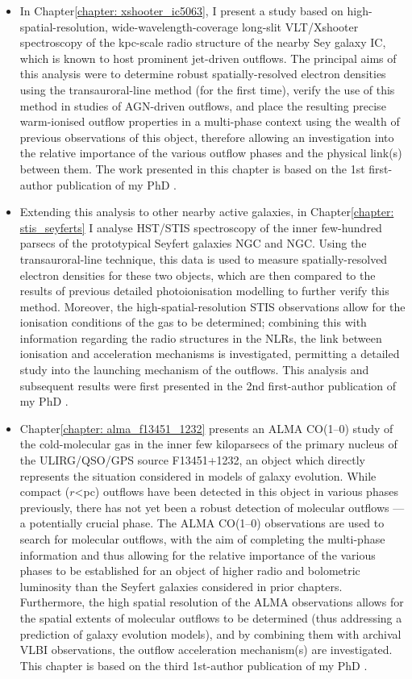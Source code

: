 \begin{itemize}
    \item In Chapter\;\ref{chapter: xshooter_ic5063}, I present a study based on high-spatial-resolution, wide-wavelength-coverage long-slit VLT/Xshooter spectroscopy of the kpc-scale radio structure of the nearby Sey galaxy IC, which is known to host prominent jet-driven outflows. The principal aims of this analysis were to determine robust spatially-resolved electron densities using the transauroral-line method (for the first time), verify the use of this method in studies of AGN-driven outflows, and place the resulting precise warm-ionised outflow properties in a multi-phase context using the wealth of previous observations of this object, therefore allowing an investigation into the relative importance of the various outflow phases and the physical link(s) between them. The work presented in this chapter is based on the 1st first-author publication of my PhD \citep{Holden2023}.
    \item Extending this analysis to other nearby active galaxies, in Chapter\;\ref{chapter: stis_seyferts} I analyse HST/STIS spectroscopy of the inner few-hundred parsecs of the prototypical Seyfert galaxies NGC and NGC. Using the transauroral-line technique, this data is used to measure spatially-resolved electron densities for these two objects, which are then compared to the results of previous detailed photoionisation modelling to further verify this method. Moreover, the high-spatial-resolution STIS observations allow for the ionisation conditions of the gas to be determined; combining this with information regarding the radio structures in the NLRs, the link between ionisation and acceleration mechanisms is investigated, permitting a detailed study into the launching mechanism of the outflows. This analysis and subsequent results were first presented in the 2nd first-author publication of my PhD \citep{HoldenTadhunter2023}.
    \item Chapter\;\ref{chapter: alma_f13451_1232} presents an ALMA CO(1--0) study of the cold-molecular gas in the inner few kiloparsecs of the primary nucleus of the ULIRG/QSO/GPS source F13451+1232, an object which directly represents the situation considered in models of galaxy evolution. While compact ($r$\;\textless{}\;pc) outflows have been detected in this object in various phases previously, there has not yet been a robust detection of molecular outflows --- a potentially crucial phase. The ALMA CO(1--0) observations are used to search for molecular outflows, with the aim of completing the multi-phase information and thus allowing for the relative importance of the various phases to be established for an object of higher radio and bolometric luminosity than the Seyfert galaxies considered in prior chapters. Furthermore, the high spatial resolution of the ALMA observations allows for the spatial extents of molecular outflows to be determined (thus addressing a prediction of galaxy evolution models), and by combining them with archival VLBI observations, the outflow acceleration mechanism(s) are investigated. This chapter is based on the third 1st-author publication of my PhD \citep{Holden2024}.

\end{itemize}
